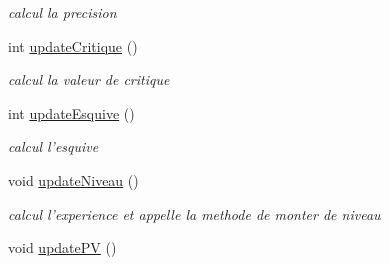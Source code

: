 \begin{DoxyCompactItemize}
\begin{DoxyCompactList}\small\item\em calcul la precision \end{DoxyCompactList}\item 
int \hyperlink{classPersonnage_ab96e4988ee1e14a3e5e728305142b087}{update\-Critique} ()
\begin{DoxyCompactList}\small\item\em calcul la valeur de critique \end{DoxyCompactList}\item 
int \hyperlink{classPersonnage_a07c30a08ae68fd69e19bb536853d9fd5}{update\-Esquive} ()
\begin{DoxyCompactList}\small\item\em calcul l'esquive \end{DoxyCompactList}\item 
void \hyperlink{classPersonnage_af735b2cf101b1cabbbd14cc24b6a935d}{update\-Niveau} ()
\begin{DoxyCompactList}\small\item\em calcul l'experience et appelle la methode de monter de niveau \end{DoxyCompactList}\item 
\hypertarget{classPersonnage_a1498effa56d179e4f98b2715201f6260}{void \hyperlink{classPersonnage_a1498effa56d179e4f98b2715201f6260}{update\-P\-V} ()}\label{classPersonnage_a1498effa56d179e4f98b2715201f6260}


\end{DoxyCompactItemize}
